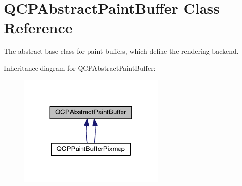 \hypertarget{class_q_c_p_abstract_paint_buffer}{}\section{Q\+C\+P\+Abstract\+Paint\+Buffer Class Reference}
\label{class_q_c_p_abstract_paint_buffer}


The abstract base class for paint buffers, which define the rendering backend.  




Inheritance diagram for Q\+C\+P\+Abstract\+Paint\+Buffer\+:\nopagebreak
\begin{figure}[H]
\begin{center}
\leavevmode
\includegraphics[width=204pt]{class_q_c_p_abstract_paint_buffer__inherit__graph}
\end{center}
\end{figure}
